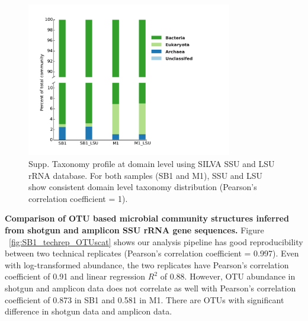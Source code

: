 \documentclass[12pt]{article}
\begin{document}
\begin{figure}[tbph!]
  \centering
  \includegraphics[width=0.8\textwidth]{figs/LSU_domain_taxa}

  \caption[Taxonomy profile at domain level using SILVA SSU and LSU
  rRNA database]{Supp. Taxonomy profile at domain level using SILVA
  SSU and LSU rRNA database. For both samples (SB1 and M1), SSU and
  LSU show consistent domain level taxonomy distribution (Pearson’s
  correlation coefficient = 1).}

  \label{fig:LSU_domain_taxa}
\end{figure}


{\bf Comparison of OTU based microbial community structures inferred
from shotgun and amplicon SSU rRNA gene sequences. } Figure
~\ref{fig:SB1_techrep_OTUscat} shows our analysis pipeline has good
reproducibility between two technical replicates (Pearson’s
correlation coefficient = 0.997). Even with log-transformed abundance,
the two replicates have Pearson’s correlation coefficient of 0.91 and
linear regression $R^2$ of 0.88. However, OTU abundance in shotgun and
amplicon data does not correlate as well with Pearson’s correlation
coefficient of 0.873 in SB1 and 0.581 in M1. There are OTUs with
significant difference in shotgun data and amplicon data.
\end{document}
